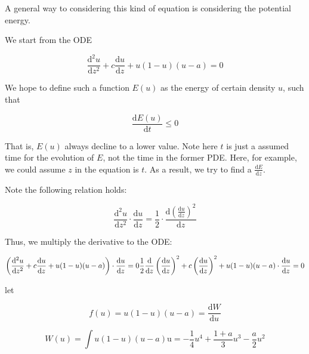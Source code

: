 \documentclass[
]{article}
\begin{document}
A general way to considering this kind of equation is considering the
potential energy.

We start from the ODE

\begin{equation*}
\frac{\mathrm{d}^2 u}{\mathrm{d} z^2} + c \frac{\mathrm{d} u}{\mathrm{d} z} + u(1-u)(u-a) = 0
\end{equation*}

We hope to define such a function $E(u)$ as the energy of certain
density $u$, such that

\begin{equation*}
\frac{\mathrm{d}E(u)}{\mathrm{d}t} \leq 0
\end{equation*}

That is, $E(u)$ always decline to a lower value. Note here $t$ is
just a assumed time for the evolution of $E$, not the time in the
former PDE. Here, for example, we could assume $z$ in the equation is
$t$. As a result, we try to find a
$\frac{\mathrm{d}E}{\mathrm{d}z}$.

Note the following relation holds:

\begin{equation*}
\frac{\mathrm{d}^2 u}{\mathrm{d} z^2} \cdot \frac{\mathrm{d} u}{\mathrm{d} z} = \frac{1}{2}\cdot\frac{\mathrm{d}\left( \frac{\mathrm{d} u}{\mathrm{d} z} \right)^2}{\mathrm{d}z}
\end{equation*}

Thus, we multiply the derivative to the ODE:

\begin{equation*}
\left( \frac{\mathrm{d}^2 u}{\mathrm{d} z^2} + c \frac{\mathrm{d} u}{\mathrm{d} z} + u(1-u)(u-a) \right) \cdot \frac{\mathrm{d} u}{\mathrm{d} z}= 0\\
\frac{1}{2}\frac{\mathrm{d}}{\mathrm{d}z}\left( \frac{\mathrm{d} u}{\mathrm{d} z} \right)^2 + c \left( \frac{\mathrm{d} u}{\mathrm{d} z} \right)^2 + u(1-u)(u-a) \cdot \frac{\mathrm{d} u}{\mathrm{d} z} = 0
\end{equation*}

let

\begin{equation*}
f(u) = u(1-u)(u-a) = \frac{\mathrm{d}W}{\mathrm{d}u}
\end{equation*}

\begin{equation*}
W(u) = \int u(1-u)(u-a) \mathrm{u} = - \frac{1}{4}u^4 + \frac{1+a}{3} u^3 - \frac{a}{2}u^2
\end{equation*}
\end{document}
